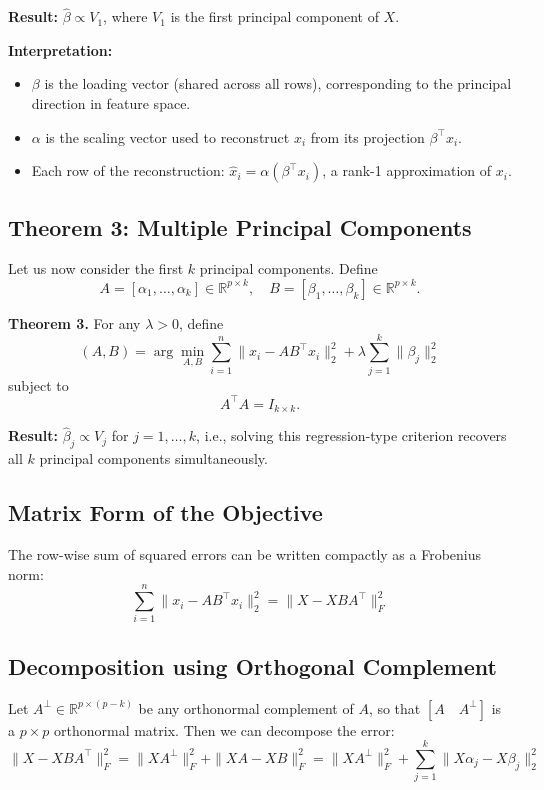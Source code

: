 \documentclass[12pt]{article}
\begin{document}
\textbf{Result:} $\hat{\beta} \propto V_1$, where $V_1$ is the first principal component of $X$.  

\textbf{Interpretation:}
\begin{itemize}
    \item $\beta$ is the loading vector (shared across all rows), corresponding to the principal direction in feature space.
    \item $\alpha$ is the scaling vector used to reconstruct $x_i$ from its projection $\beta^\top x_i$.
    \item Each row of the reconstruction: $\hat{x}_i = \alpha (\beta^\top x_i)$, a rank-1 approximation of $x_i$.
\end{itemize}

\subsection{Theorem 3: Multiple Principal Components}

Let us now consider the first $k$ principal components. Define
\[
A = [\alpha_1, \dots, \alpha_k] \in \mathbb{R}^{p \times k}, \quad
B = [\beta_1, \dots, \beta_k] \in \mathbb{R}^{p \times k}.
\]

\textbf{Theorem 3.} For any $\lambda > 0$, define
\[
(A, B) = \arg \min_{A, B} \sum_{i=1}^n \| x_i - A B^\top x_i \|_2^2 + \lambda \sum_{j=1}^k \|\beta_j\|_2^2
\]
subject to
\[
A^\top A = I_{k \times k}.
\]

\textbf{Result:} $\hat{\beta}_j \propto V_j$ for $j = 1, \dots, k$, i.e., solving this regression-type criterion recovers all $k$ principal components simultaneously.

\subsection{Matrix Form of the Objective}

The row-wise sum of squared errors can be written compactly as a Frobenius norm:
\[
\sum_{i=1}^n \| x_i - A B^\top x_i \|_2^2 = \| X - X B A^\top \|_F^2
\]

\subsection{Decomposition using Orthogonal Complement}

Let $A^\perp \in \mathbb{R}^{p \times (p-k)}$ be any orthonormal complement of $A$, so that $[A \quad A^\perp]$ is a $p \times p$ orthonormal matrix. Then we can decompose the error:
\[
\| X - X B A^\top \|_F^2 = \| X A^\perp \|_F^2 + \| X A - X B \|_F^2
= \| X A^\perp \|_F^2 + \sum_{j=1}^k \| X \alpha_j - X \beta_j \|_2^2
\]
\end{document}
